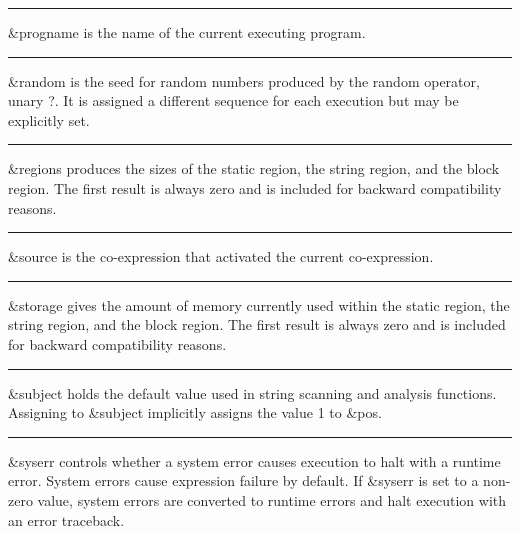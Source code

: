 \bigskip\hrule\vspace{0.1cm}

\noindent
{}\textsf{\&progname} is the name of the current
executing program.

\bigskip\hrule\vspace{0.1cm}

\noindent
{}\textsf{\&random} is the seed for random
numbers produced by the random operator, unary \textsf{?}. It is
assigned a different sequence for each execution but may be explicitly
set.

\bigskip\hrule\vspace{0.1cm}

\noindent
{}\textsf{\&regions} produces the sizes of the static
region, the string region, and the block region. The first result is
always zero and is included for backward compatibility reasons.

\bigskip\hrule\vspace{0.1cm}

\noindent
\textsf{\&source} is the co-expression that activated the current
co-expression.

\bigskip\hrule\vspace{0.1cm}

\noindent
{}\textsf{\&storage} gives the amount of memory
currently used within the static region, the string region, and the
block region. The first result is always zero and is included for
backward compatibility reasons.

\bigskip\hrule\vspace{0.1cm}

\noindent
{}\textsf{\&subject} holds the default
value used in string scanning and analysis functions. Assigning to
\textsf{\&subject} implicitly assigns the value \textsf{1} to
\textsf{\&pos}.

\bigskip\hrule\vspace{0.1cm}

\noindent
\textsf{\&syserr} controls whether a system error causes execution to
halt with a runtime error. System errors cause expression failure by
default. If \textsf{\&syserr} is set to a non-zero value, system errors
are converted to runtime errors and halt execution with an error
traceback.

